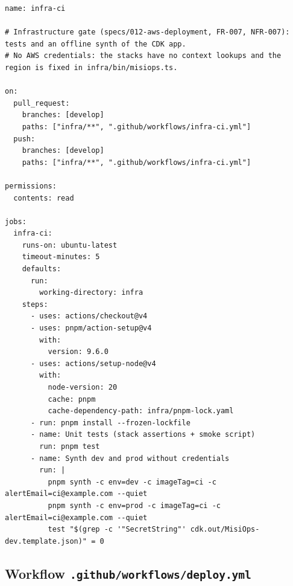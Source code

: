 \begin{lstlisting}
name: infra-ci

# Infrastructure gate (specs/012-aws-deployment, FR-007, NFR-007): tests and an offline synth of the CDK app.
# No AWS credentials: the stacks have no context lookups and the region is fixed in infra/bin/misiops.ts.

on:
  pull_request:
    branches: [develop]
    paths: ["infra/**", ".github/workflows/infra-ci.yml"]
  push:
    branches: [develop]
    paths: ["infra/**", ".github/workflows/infra-ci.yml"]

permissions:
  contents: read

jobs:
  infra-ci:
    runs-on: ubuntu-latest
    timeout-minutes: 5
    defaults:
      run:
        working-directory: infra
    steps:
      - uses: actions/checkout@v4
      - uses: pnpm/action-setup@v4
        with:
          version: 9.6.0
      - uses: actions/setup-node@v4
        with:
          node-version: 20
          cache: pnpm
          cache-dependency-path: infra/pnpm-lock.yaml
      - run: pnpm install --frozen-lockfile
      - name: Unit tests (stack assertions + smoke script)
        run: pnpm test
      - name: Synth dev and prod without credentials
        run: |
          pnpm synth -c env=dev -c imageTag=ci -c alertEmail=ci@example.com --quiet
          pnpm synth -c env=prod -c imageTag=ci -c alertEmail=ci@example.com --quiet
          test "$(grep -c '"SecretString"' cdk.out/MisiOps-dev.template.json)" = 0
\end{lstlisting}

\subsection{Workflow \texttt{.github/workflows/deploy.yml}}
\label{anx:deploy}

